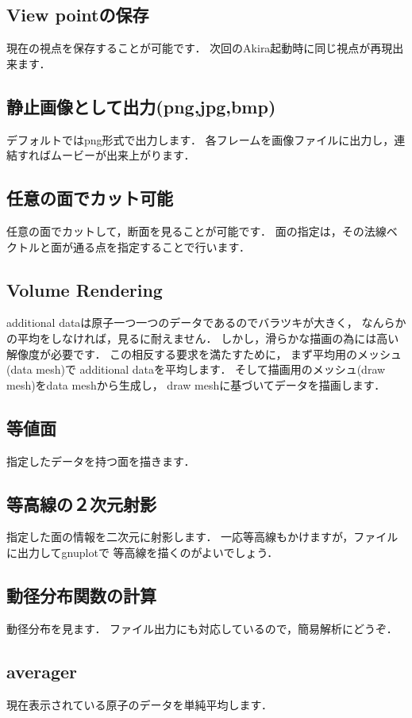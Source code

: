 \documentclass[a4j,openany]{jbook}
\begin{document}
  \subsection*{View pointの保存}
  現在の視点を保存することが可能です．
  次回のAkira起動時に同じ視点が再現出来ます．

  \subsection*{静止画像として出力(png,jpg,bmp)}
  デフォルトではpng形式で出力します．
  各フレームを画像ファイルに出力し，連結すればムービーが出来上がります．

  \subsection*{任意の面でカット可能}
  任意の面でカットして，断面を見ることが可能です．
  面の指定は，その法線ベクトルと面が通る点を指定することで行います．

  \subsection*{Volume Rendering}
  additional dataは原子一つ一つのデータであるのでバラツキが大きく，
  なんらかの平均をしなければ，見るに耐えません．
  しかし，滑らかな描画の為には高い解像度が必要です．
  この相反する要求を満たすために， まず平均用のメッシュ(data mesh)で
  additional dataを平均します．
  そして描画用のメッシュ(draw mesh)をdata meshから生成し，
  draw meshに基づいてデータを描画します．

  \subsection*{等値面}
  指定したデータを持つ面を描きます．

  \subsection*{等高線の２次元射影}
  指定した面の情報を二次元に射影します．
  一応等高線もかけますが，ファイルに出力してgnuplotで
  等高線を描くのがよいでしょう．

  \subsection*{動径分布関数の計算}
  動径分布を見ます． ファイル出力にも対応しているので，簡易解析にどうぞ．

  \subsection*{averager}
  現在表示されている原子のデータを単純平均します．
\end{document}
